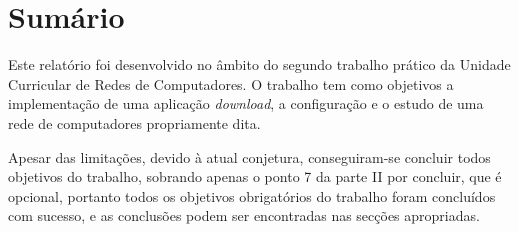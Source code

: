 \section*{Sumário}

Este relatório foi desenvolvido no âmbito do segundo trabalho prático da Unidade Curricular de Redes de Computadores. O trabalho tem como objetivos a implementação de uma aplicação \emph{download}, a configuração e o estudo de uma rede de computadores propriamente dita.

\noindent Apesar das limitações, devido à atual conjetura, conseguiram-se concluir todos objetivos do trabalho, sobrando apenas o ponto 7 da parte II por concluir, que é opcional, portanto todos os objetivos obrigatórios do trabalho foram concluídos com sucesso, e as conclusões podem ser encontradas nas secções apropriadas.